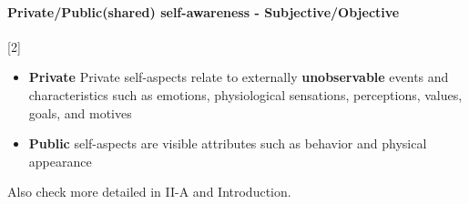 \documentclass{article}
\begin{document}
		\paragraph{Private/Public(shared) self-awareness - Subjective/Objective}  \citet{regazzoni-2020-multi-sensorial-generative-and-descriptive-self-awareness-models-for-autonomous-systems}[2]
			\begin{itemize}
				\item \textbf{Private} Private self-aspects relate to externally \textbf{unobservable} events and characteristics such as emotions, physiological sensations, perceptions, values, goals, and motives
				\item \textbf{Public} self-aspects are visible attributes such as behavior and physical appearance
			\end{itemize}
			Also check more detailed in \cite{lewis-2011-a-survey-of-self-awareness-and-its-application-in-computing-systems} II-A and \cite{baydoun-2018-a-multi-perspective-approach-to-anomaly-detection-for-self-aware-embodied-agents} Introduction.
\end{document}

